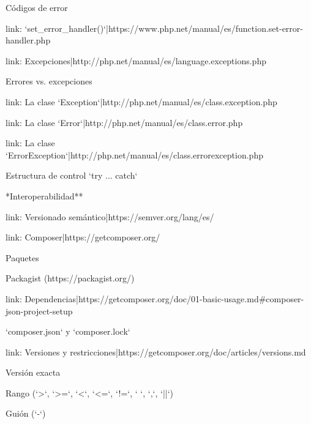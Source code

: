 \begin{longenum}
\begin{longenum}
        \begin{longenum}
            \item Códigos de error
            \item [link: `set_error_handler()`|https://www.php.net/manual/es/function.set-error-handler.php]
        \end{longenum}
        \item [link: Excepciones|http://php.net/manual/es/language.exceptions.php]
        \begin{longenum}
            \item Errores vs. excepciones
            \item [link: La clase `Exception`|http://php.net/manual/es/class.exception.php]
            \item [link: La clase `Error`|http://php.net/manual/es/class.error.php]
            \item [link: La clase `ErrorException`|http://php.net/manual/es/class.errorexception.php]
            \item Estructura de control `try ... catch`
        \end{longenum}
    \end{longenum}
    \item **Interoperabilidad**
    \begin{longenum}
        \item [link: Versionado semántico|https://semver.org/lang/es/]
        \item [link: Composer|https://getcomposer.org/]
        \begin{longenum}
            \item Paquetes
            \item [Packagist](https://packagist.org/)
            \item [link: Dependencias|https://getcomposer.org/doc/01-basic-usage.md#composer-json-project-setup]
            \begin{longenum}
                \item `composer.json` y `composer.lock`
            \end{longenum}
            \item [link: Versiones y restricciones|https://getcomposer.org/doc/articles/versions.md]
            \begin{longenum}
                \item Versión exacta
                \item Rango (`>`, `>=`, `<`, `<=`, `!=`, ` `, `,`, `||`)
                \item Guión (`-`)

\end{longenum}
\end{longenum}
\end{longenum}
\end{longenum}
